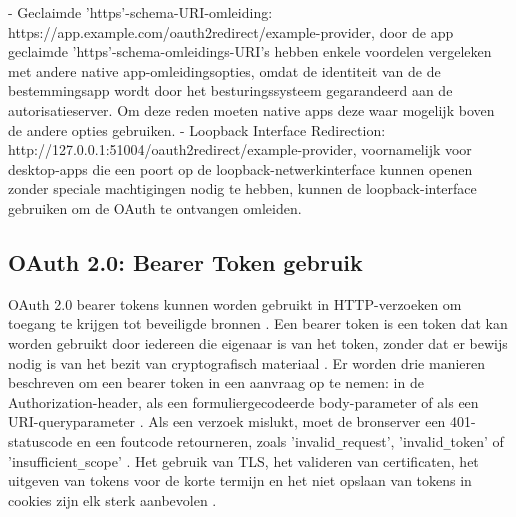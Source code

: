 \newline
- Geclaimde 'https'-schema-URI-omleiding: https://app.example.com/oauth2redirect/example-provider, door de app geclaimde 'https'-schema-omleidings-URI's hebben enkele voordelen vergeleken met andere native app-omleidingsopties, omdat de identiteit van de de bestemmingsapp wordt door het besturingssysteem gegarandeerd aan de autorisatieserver. Om deze reden moeten native apps deze waar mogelijk boven de andere opties gebruiken.
\newline
- Loopback Interface Redirection: http://127.0.0.1:51004/oauth2redirect/example-provider, voornamelijk voor desktop-apps die een poort op de loopback-netwerkinterface kunnen openen zonder speciale machtigingen nodig te hebben, kunnen de loopback-interface gebruiken om de OAuth te ontvangen omleiden.


\subsection{OAuth 2.0: Bearer Token gebruik}%
\label{subsec:oauth-2.0-bearer-token-gebruik}
OAuth 2.0 bearer tokens kunnen worden gebruikt in HTTP-verzoeken om toegang te krijgen tot beveiligde bronnen \autocite[p.~{Section 1.0}]{Jones2012}.
Een bearer token is een token dat kan worden gebruikt door iedereen die eigenaar is van het token, zonder dat er bewijs nodig is van het bezit van cryptografisch materiaal \autocite[p.~{Section 1.2}]{Jones2012}.
Er worden drie manieren beschreven om een bearer token in een aanvraag op te nemen: in de Authorization-header, als een formuliergecodeerde body-parameter of als een URI-queryparameter \autocite[p.~{Section 2.1}]{Jones2012}. Als een verzoek mislukt, moet de bronserver een 401-statuscode en een foutcode retourneren, zoals 'invalid\verb|_|request', 'invalid\verb|_|token' of 'insufficient\verb|_|scope' \autocite[p.~{Section 3.0}]{Jones2012}.
Het gebruik van TLS, het valideren van certificaten, het uitgeven van tokens voor de korte termijn en het niet opslaan van tokens in cookies zijn elk sterk aanbevolen \autocite[p.~{Section 5.0}]{Jones2012}.


